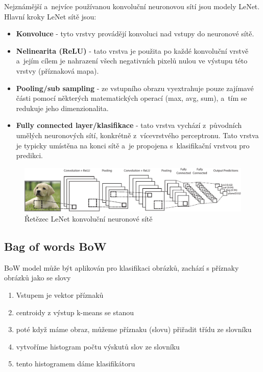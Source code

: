 Nejznámější a~nejvíce používanou konvoluční neuronovou sítí jsou modely LeNet.
Hlavní kroky LeNet sítě jsou:
\begin{itemize}
  \item{\textbf{Konvoluce} - tyto vrstvy provádějí konvoluci nad vstupy do neuronové sítě.}
  \item{\textbf{Nelinearita (ReLU)} - tato vrstva je použita po každé konvoluční vrstvě a~jejím cílem je nahrazení všech negativních pixelů nulou ve výstupu této vrstvy (příznaková mapa).}
  \item{\textbf{Pooling/sub sampling} - ze vstupního obrazu vyextrahuje pouze zajímavé části pomocí některých matematických operací (max, avg, sum), a~tím se redukuje jeho dimenzionalita.}
  \item{\textbf{Fully connected layer/klasifikace} - tato vrstva vychází z~původních umělých neuronových sítí, konkrétně z~vícevrstvého perceptronu. Tato vrstva je typicky umístěna na konci sítě a~je propojena s~klasifikační vrstvou pro predikci.}
\end{itemize}
\begin{figure}[H]
\centering
\includegraphics[width=1.1\linewidth]{assets/9_cnn.pdf}
\caption{Řetězec LeNet konvoluční neuronové sítě}
\label{fig:cnn}
\end{figure}

\subsection{Bag of words BoW}
BoW model může být aplikován pro klasifikaci obrázků, zachází s příznaky obrázků jako se slovy
\begin{enumerate}
\item Vstupem je vektor příznaků
\item centroidy z výstup k-means se stanou 
\item poté když máme obraz, můžeme příznaku (slovu) přiřadit třídu ze slovníku
\item vytvoříme histogram počtu výskutů slov ze slovníku
\item tento histogramem dáme klasifikátoru
\end{enumerate}
